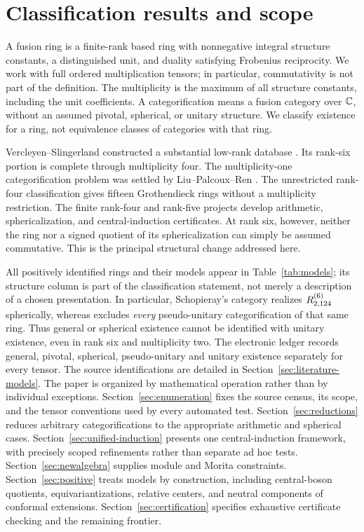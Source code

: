 \section{Classification results and scope}\label{sec:results}
A fusion ring is a finite-rank based ring with nonnegative integral
structure constants, a distinguished unit, and duality satisfying
Frobenius reciprocity. We work with full ordered multiplication tensors;
in particular, commutativity is not part of the definition.
The multiplicity is the maximum of all structure constants, including
the unit coefficients. A categorification means a fusion category over
$\mathbb C$, without an assumed pivotal, spherical, or unitary structure.
We classify existence for a ring, not equivalence classes of categories
with that ring.

Vercleyen--Slingerland constructed a substantial low-rank database
\cite{VS}. Its rank-six portion is complete through multiplicity four.
The multiplicity-one categorification problem was settled by
Liu--Palcoux--Ren \cite{LPR}. The unrestricted rank-four classification
\cite{Rank4General} gives fifteen Grothendieck rings without a multiplicity
restriction. The finite rank-four and rank-five projects
\cite{DP4,DP5} develop arithmetic, sphericalization, and central-induction
certificates. At rank six, however, neither the ring nor a signed quotient
of its sphericalization can simply be assumed commutative. This is the
principal structural change addressed here.


All positively identified rings and their models appear in
Table~\ref{tab:models}; its structure column is part of the classification
statement, not merely a description of a chosen presentation. In
particular, Schopieray's category \cite[Example~1]{SchNonPU} realizes
$R^{(6)}_{2,124}$ spherically, whereas \cite[Theorem~1]{SchNonPU} excludes
\emph{every} pseudo-unitary categorification of that same ring.
Thus general or spherical existence cannot be identified with unitary
existence, even in rank six and multiplicity two. The electronic ledger
records general, pivotal, spherical, pseudo-unitary and unitary existence
separately for every tensor. The source identifications are detailed in Section~\ref{sec:literature-models}.
The paper is organized by mathematical operation rather than by individual
exceptions. Section~\ref{sec:enumeration} fixes the source census, its scope, and
the tensor conventions used by every automated test. Section~\ref{sec:reductions} reduces arbitrary
categorifications to the appropriate arithmetic and spherical cases.
Section~\ref{sec:unified-induction} presents one central-induction framework,
with precisely scoped refinements rather than separate ad hoc tests.
Section~\ref{sec:newalgebra} supplies module and Morita constraints.
Section~\ref{sec:positive} treats models by construction, including
central-boson quotients, equivariantizations, relative centers, and
neutral components of conformal extensions.
Section~\ref{sec:certification} specifies exhaustive certificate checking
and the remaining frontier.

